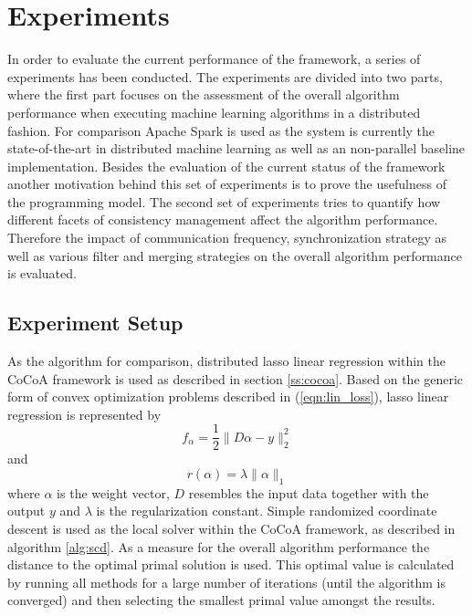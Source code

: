 
\chapter{Experiments}
\label{c:experiments}
In order to evaluate the current performance of the framework, a series of experiments has been conducted.
The experiments are divided into two parts, where the first part focuses on the assessment of the overall algorithm performance when executing machine learning algorithms in a distributed fashion.
For comparison Apache Spark is used as the system is currently the state-of-the-art in distributed machine learning as well as an non-parallel baseline implementation.
Besides the evaluation of the current status of the framework another motivation behind this set of experiments is to prove the usefulness of the programming model.
The second set of experiments tries to quantify how different facets of consistency management affect the algorithm performance.
Therefore the impact of communication frequency, synchronization strategy as well as various filter and merging strategies on the overall algorithm performance is evaluated.

\section{Experiment Setup}
As the algorithm for comparison, distributed lasso linear regression within the CoCoA framework is used as described in section \ref{ss:cocoa}.
Based on the generic form of convex optimization problems described in (\ref{eqn:lin_loss}), lasso linear regression is represented by
\begin{equation}
f_\alpha = \frac{1}{2} \parallel D\alpha - y \parallel^2_2
\label{eqn:lasso}
\end{equation}
and
\begin{equation}
r(\alpha) = \lambda \parallel \alpha \parallel_1
\label{eqn:lasso_reg}
\end{equation}
where $\alpha$ is the weight vector, $D$ resembles the input data together with the output $y$ and $\lambda$ is the regularization constant.
Simple randomized coordinate descent is used as the local solver within the CoCoA framework, as described in algorithm \ref{alg:scd}.
As a measure for the overall algorithm performance the distance to the optimal primal solution is used. This optimal value is calculated by running all methods for a large number of iterations (until the algorithm is converged) and then selecting the smallest primal value amongst the results.

